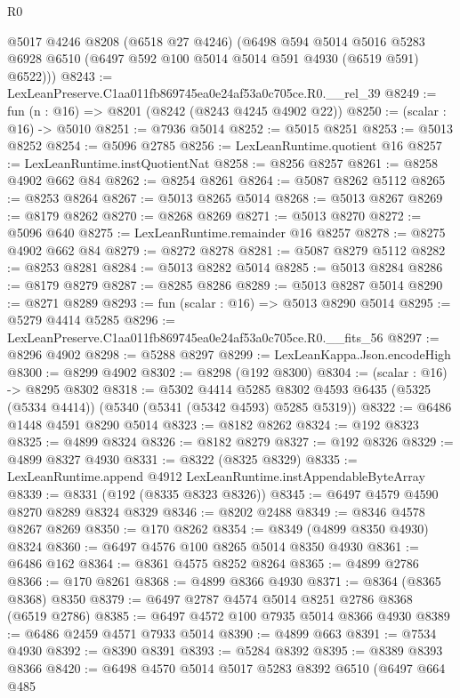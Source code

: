 \begin{lexlean}{R0}
\begin{coremodule}
      @5017
      @4246
      @8208
      (@6518 @27 @4246)
      (@6498
        @594
        @5014
        @5016
        @5283
        @6928
        @6510
        (@6497 @592 @100 @5014 @5014 @591 @4930 (@6519 @591) @6522)))
@8243 := LexLeanPreserve.C1aa011fb869745ea0e24af53a0c705ce.R0.__rel_39
@8249 := fun (n : @16) => @8201 (@8242 (@8243 @4245 @4902 @22))
@8250 := (scalar : @16) -> @5010
@8251 := @7936 @5014
@8252 := @5015 @8251
@8253 := @5013 @8252
@8254 := @5096 @2785
@8256 := LexLeanRuntime.quotient @16
@8257 := LexLeanRuntime.instQuotientNat
@8258 := @8256 @8257
@8261 := @8258 @4902 @662 @84
@8262 := @8254 @8261
@8264 := @5087 @8262 @5112
@8265 := @8253 @8264
@8267 := @5013 @8265 @5014
@8268 := @5013 @8267
@8269 := @8179 @8262
@8270 := @8268 @8269
@8271 := @5013 @8270
@8272 := @5096 @640
@8275 := LexLeanRuntime.remainder @16 @8257
@8278 := @8275 @4902 @662 @84
@8279 := @8272 @8278
@8281 := @5087 @8279 @5112
@8282 := @8253 @8281
@8284 := @5013 @8282 @5014
@8285 := @5013 @8284
@8286 := @8179 @8279
@8287 := @8285 @8286
@8289 := @5013 @8287 @5014
@8290 := @8271 @8289
@8293 := fun (scalar : @16) => @5013 @8290 @5014
@8295 := @5279 @4414 @5285
@8296 := LexLeanPreserve.C1aa011fb869745ea0e24af53a0c705ce.R0.__fits_56
@8297 := @8296 @4902
@8298 := @5288 @8297
@8299 := LexLeanKappa.Json.encodeHigh
@8300 := @8299 @4902
@8302 := @8298 (@192 @8300)
@8304 := (scalar : @16) -> @8295 @8302
@8318 := @5302
    @4414
    @5285
    @8302
    @4593
    @6435
    (@5325 (@5334 @4414))
    (@5340 (@5341 (@5342 @4593) @5285 @5319))
@8322 := @6486 @1448 @4591 @8290 @5014
@8323 := @8182 @8262
@8324 := @192 @8323
@8325 := @4899 @8324
@8326 := @8182 @8279
@8327 := @192 @8326
@8329 := @4899 @8327 @4930
@8331 := @8322 (@8325 @8329)
@8335 := LexLeanRuntime.append @4912 LexLeanRuntime.instAppendableByteArray
@8339 := @8331 (@192 (@8335 @8323 @8326))
@8345 := @6497 @4579 @4590 @8270 @8289 @8324 @8329
@8346 := @8202 @2488
@8349 := @8346 @4578 @8267 @8269
@8350 := @170 @8262
@8354 := @8349 (@4899 @8350 @4930) @8324
@8360 := @6497 @4576 @100 @8265 @5014 @8350 @4930
@8361 := @6486 @162
@8364 := @8361 @4575 @8252 @8264
@8365 := @4899 @2786
@8366 := @170 @8261
@8368 := @4899 @8366 @4930
@8371 := @8364 (@8365 @8368) @8350
@8379 := @6497 @2787 @4574 @5014 @8251 @2786 @8368 (@6519 @2786)
@8385 := @6497 @4572 @100 @7935 @5014 @8366 @4930
@8389 := @6486 @2459 @4571 @7933 @5014
@8390 := @4899 @663
@8391 := @7534 @4930
@8392 := @8390 @8391
@8393 := @5284 @8392
@8395 := @8389 @8393 @8366
@8420 := @6498
    @4570
    @5014
    @5017
    @5283
    @8392
    @6510
    (@6497
      @664
      @485

\end{coremodule}
\end{lexlean}
